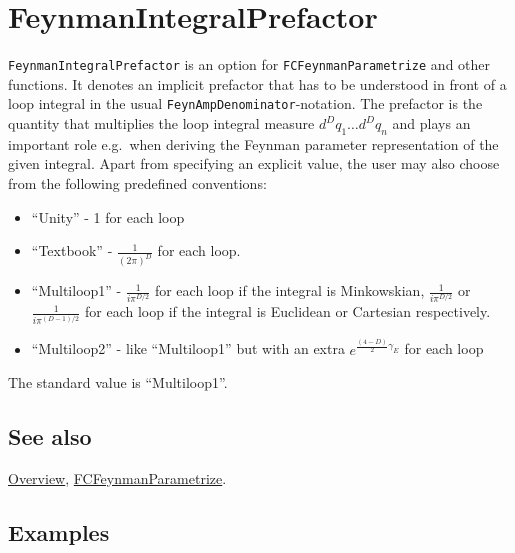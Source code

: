 \documentclass[../FeynCalcManual.tex]{subfiles}
\begin{document}
\hypertarget{feynmanintegralprefactor}{
\section{FeynmanIntegralPrefactor}\label{feynmanintegralprefactor}}

\texttt{FeynmanIntegralPrefactor} is an option for
\texttt{FCFeynmanParametrize} and other functions. It denotes an
implicit prefactor that has to be understood in front of a loop integral
in the usual \texttt{FeynAmpDenominator}-notation. The prefactor is the
quantity that multiplies the loop integral measure
\(d^D q_1 \ldots d^D q_n\) and plays an important role e.g.~when
deriving the Feynman parameter representation of the given integral.
Apart from specifying an explicit value, the user may also choose from
the following predefined conventions:

\begin{itemize}
\tightlist
\item
  ``Unity'' - 1 for each loop
\item
  ``Textbook'' - \(\frac{1}{(2\pi)^D}\) for each loop.
\item
  ``Multiloop1'' - \(\frac{1}{i \pi^{D/2}}\) for each loop if the
  integral is Minkowskian, \(\frac{1}{i \pi^{D/2}}\) or
  \(\frac{1}{i \pi^{(D-1)/2}}\) for each loop if the integral is
  Euclidean or Cartesian respectively.
\item
  ``Multiloop2'' - like ``Multiloop1'' but with an extra
  \(e^{\frac{(4-D)}{2} \gamma_E}\) for each loop
\end{itemize}

The standard value is ``Multiloop1''.

\subsection{See also}

\hyperlink{toc}{Overview},
\hyperlink{fcfeynmanparametrize}{FCFeynmanParametrize}.

\subsection{Examples}

\begin{Shaded}
\begin{Highlighting}[]
\OperatorTok{[}\OperatorTok{[}\OperatorTok{,}  \SpecialCharTok{{-}} \OperatorTok{],} \OperatorTok{\{}\OperatorTok{\},}  \OtherTok{{-}\textgreater{}} \OperatorTok{,}\OtherTok{{-}\textgreater{}} \OperatorTok{\{} \OtherTok{{-}\textgreater{}}  \SpecialCharTok{{-}} \OperatorTok{\}]}
\end{Highlighting}
\end{Shaded}
\end{document}
